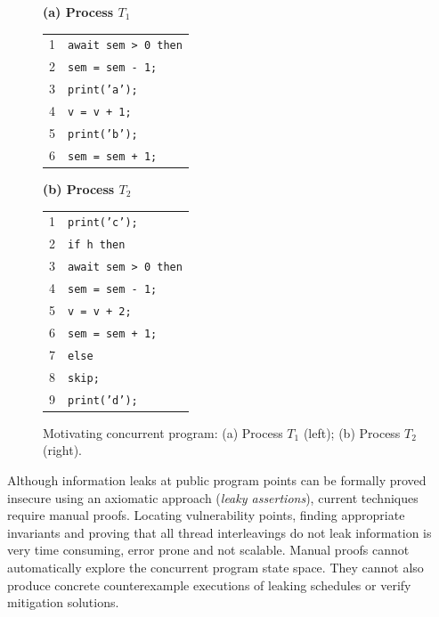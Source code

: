 \documentclass[a4paper,12pt]{report}
\begin{document}
\begin{figure}[H]
\centering
\singlespacing
\small
\renewcommand{\arraystretch}{0.85}
\begin{minipage}[t]{0.45\textwidth}
\centering
\textbf{(a) Process $T_1$}\\[0.05cm]
\begin{tabular}{|rl|}
\hline
1 & \texttt{await sem > 0 then} \\
2 & \quad \texttt{sem = sem - 1;} \\
3 & \quad \texttt{print('a');} \\
4 & \quad \texttt{v = v + 1;} \\
5 & \quad \texttt{print('b');} \\
6 & \quad \texttt{sem = sem + 1;} \\
\hline
\end{tabular}
\end{minipage}
\hfill
\begin{minipage}[t]{0.48\textwidth}
\centering
\textbf{(b) Process $T_2$}\\[0.05cm]
\begin{tabular}{|rl|}
\hline
1 & \texttt{print('c');} \\
2 & \texttt{if h then} \\
3 & \quad \texttt{await sem > 0 then} \\
4 & \quad\quad \texttt{sem = sem - 1;} \\
5 & \quad\quad \texttt{v = v + 2;} \\
6 & \quad\quad \texttt{sem = sem + 1;} \\
7 & \texttt{else} \\
8 & \quad \texttt{skip;} \\
9 & \texttt{print('d');} \\
\hline
\end{tabular}
\end{minipage}
\vspace{-0.2cm}
\caption{Motivating concurrent program: (a) Process $T_1$ (left); (b) Process $T_2$ (right).}
\label{fig:motivating-example}
\end{figure}

\clearpage

Although information leaks at public program points can be formally proved insecure using an axiomatic approach (\emph{leaky assertions}), current techniques require manual proofs. Locating vulnerability points, finding appropriate invariants and proving that all thread interleavings do not leak information is very time consuming, error prone and not scalable. Manual proofs cannot automatically explore the concurrent program state space. They cannot also produce concrete counterexample executions of leaking schedules or verify mitigation solutions.
\end{document}
